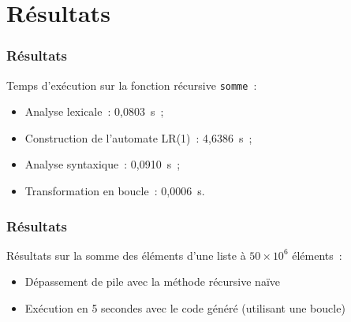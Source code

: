 
\section{Résultats}

\begin{frame}
    \frametitle{Résultats}

    Temps d’exécution sur la fonction récursive \texttt{somme}~:
    \pause
    \begin{itemize}
        \item Analyse lexicale~: 0,0803~\si{\second}~;
        \pause
        \item Construction de l’automate LR(1)~: 4,6386~\si{\second}~;
        \pause
        \item Analyse syntaxique~: 0,0910~\si{\second}~;
        \pause
        \item Transformation en boucle~: 0,0006~\si{\second}.
    \end{itemize}

\end{frame}

\begin{frame}
  \frametitle{Résultats}

  Résultats sur la somme des éléments d’une liste à $50\times 10^6$ éléments~:
  \pause
  \begin{itemize}
    \item Dépassement de pile avec la méthode récursive naïve
    \item Exécution en 5 secondes avec le code généré (utilisant une boucle)
  \end{itemize}
\end{frame}

